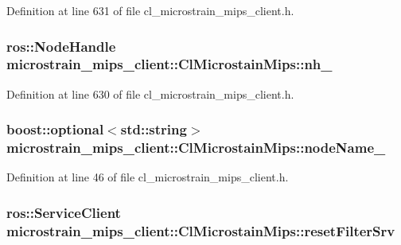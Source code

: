 Definition at line 631 of file cl\+\_\+microstrain\+\_\+mips\+\_\+client.\+h.

\subsubsection[{\texorpdfstring{nh\+\_\+}{nh_}}]{\setlength{\rightskip}{0pt plus 5cm}ros\+::\+Node\+Handle microstrain\+\_\+mips\+\_\+client\+::\+Cl\+Microstain\+Mips\+::nh\+\_\+\hspace{0.3cm}{\ttfamily [protected]}}\hypertarget{classmicrostrain__mips__client_1_1ClMicrostainMips_a9fa8bd8b528fb13bf655f87b950a145c}{}\label{classmicrostrain__mips__client_1_1ClMicrostainMips_a9fa8bd8b528fb13bf655f87b950a145c}


Definition at line 630 of file cl\+\_\+microstrain\+\_\+mips\+\_\+client.\+h.

\subsubsection[{\texorpdfstring{node\+Name\+\_\+}{nodeName_}}]{\setlength{\rightskip}{0pt plus 5cm}boost\+::optional$<$std\+::string$>$ microstrain\+\_\+mips\+\_\+client\+::\+Cl\+Microstain\+Mips\+::node\+Name\+\_\+}\hypertarget{classmicrostrain__mips__client_1_1ClMicrostainMips_a77c64d7b6e365b53747deee751c0a65d}{}\label{classmicrostrain__mips__client_1_1ClMicrostainMips_a77c64d7b6e365b53747deee751c0a65d}


Definition at line 46 of file cl\+\_\+microstrain\+\_\+mips\+\_\+client.\+h.

\subsubsection[{\texorpdfstring{reset\+Filter\+Srv}{resetFilterSrv}}]{\setlength{\rightskip}{0pt plus 5cm}ros\+::\+Service\+Client microstrain\+\_\+mips\+\_\+client\+::\+Cl\+Microstain\+Mips\+::reset\+Filter\+Srv\hspace{0.3cm}{\ttfamily [protected]}}\hypertarget{classmicrostrain__mips__client_1_1ClMicrostainMips_a160255b2be08602d22c371f49cdcfdc0}{}\label{classmicrostrain__mips__client_1_1ClMicrostainMips_a160255b2be08602d22c371f49cdcfdc0}


